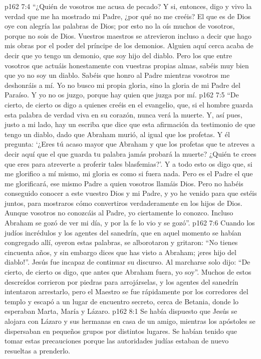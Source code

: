 \vs p162 7:4 “¿Quién de vosotros me acusa de pecado? Y si, entonces, digo y vivo la verdad que me ha mostrado mi Padre, ¿por qué no me creéis? El que es de Dios oye con alegría las palabras de Dios; por esto no la oís muchos de vosotros, porque no sois de Dios. Vuestros maestros se atrevieron incluso a decir que hago mis obras por el poder del príncipe de los demonios. Alguien aquí cerca acaba de decir que yo tengo un demonio, que soy hijo del diablo. Pero los que entre vosotros que actuáis honestamente con vuestras propias almas, sabéis muy bien que yo no soy un diablo. Sabéis que honro al Padre mientras vosotros me deshonráis a mí. Yo no busco mi propia gloria, sino la gloria de mi Padre del Paraíso. Y yo no os juzgo, porque hay quien que juzga por mí.
\vs p162 7:5 “De cierto, de cierto os digo a quienes creéis en el evangelio, que, si el hombre guarda esta palabra de verdad viva en su corazón, nunca verá la muerte. Y, así pues, justo a mi lado, hay un escriba que dice que esta afirmación da testimonio de que tengo un diablo, dado que Abraham murió, al igual que los profetas. Y él pregunta: ‘¿Eres tú acaso mayor que Abraham y que los profetas que te atreves a decir aquí que el que guarda tu palabra jamás probará la muerte? ¿Quién te crees que eres para atreverte a proferir tales blasfemias?’. Y a todo esto os digo que, si me glorifico a mí mismo, mi gloria es como si fuera nada. Pero es el Padre el que me glorificará, ese mismo Padre a quien vosotros llamáis Dios. Pero no habéis conseguido conocer a este vuestro Dios y mi Padre, y yo he venido para que estéis juntos, para mostraros cómo convertiros verdaderamente en los hijos de Dios. Aunque vosotros no conozcáis al Padre, yo ciertamente lo conozco. Incluso Abraham se gozó de ver mi día, y por la fe lo vio y se gozó”.
\vs p162 7:6 \pc Cuando los judíos incrédulos y los agentes del sanedrín, que en aquel momento se habían congregado allí, oyeron estas palabras, se alborotaron y gritaron: “No tienes cincuenta años, y sin embargo dices que has visto a Abraham; ¡eres hijo del diablo!”. Jesús fue incapaz de continuar su discurso. Al marcharse solo dijo: “De cierto, de cierto os digo, que antes que Abraham fuera, yo soy”. Muchos de estos descreídos corrieron por piedras para arrojárselas, y los agentes del sanedrín intentaron arrestarlo, pero el Maestro se fue rápidamente por los corredores del templo y escapó a un lugar de encuentro secreto, cerca de Betania, donde lo esperaban Marta, María y Lázaro.
\vs p162 8:1 Se había dispuesto que Jesús se alojara con Lázaro y sus hermanas en casa de un amigo, mientras los apóstoles se dispersaban en pequeños grupos por distintos lugares. Se habían tenido que tomar estas precauciones porque las autoridades judías estaban de nuevo resueltas a prenderlo.
